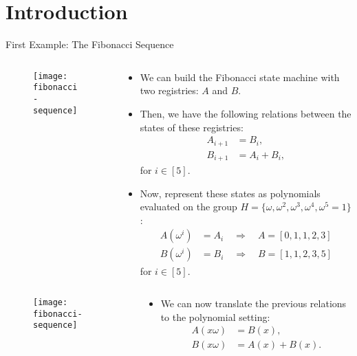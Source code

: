 
\section{Introduction}

\begin{frame}[allowframebreaks]{First Example: The Fibonacci Sequence}
\begin{columns}
\begin{column}{0.3\textwidth}
\begin{figure}
	\texttt{[image: fibonacci-sequence]}
\end{figure}
\end{column}
\begin{column}{0.7\textwidth}
\begin{itemize}
\small
\item We can build the Fibonacci state machine with two registries: $A$ and $B$.
\item Then, we have the following relations between the states of these registries:
\begin{align*}
A_{i+1} &= B_i, \\
B_{i+1} &= A_i + B_i,
\end{align*}
for $i \in [5]$.

\item Now, represent these states as polynomials evaluated on the group $H = \{\omega, \omega^2, \omega^3, \omega^4, \omega^5 = 1\}$:
\begin{align*}
A(\omega^i) &= A_i \quad \Longrightarrow \quad A = [0, 1, 1, 2, 3] \\
B(\omega^i) &= B_i \quad \Longrightarrow \quad B = [1, 1, 2, 3, 5]
\end{align*}
for $i \in [5]$.
\end{itemize}
\end{column}
\end{columns}

\begin{columns}
\begin{column}{0.3\textwidth}
\begin{figure}
	\texttt{[image: fibonacci-sequence]}
\end{figure}
\end{column}
\begin{column}{0.7\textwidth}
\begin{itemize}
\small
\item We can now translate the previous relations to the polynomial setting:
\begin{align*}
A(x\omega) &=  B(x), \\
B(x\omega) &=  A(x) + B(x).
\end{align*}


\end{itemize}
\end{column}
\end{columns}
\end{frame}
